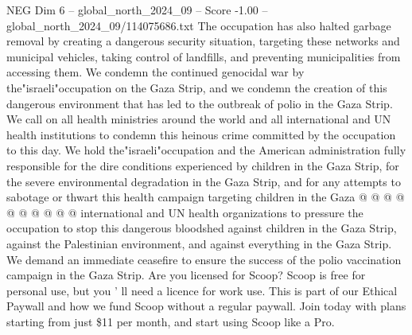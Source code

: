 \begin{textsample}{NEG Dim 6 – global\_north\_2024\_09 – Score -1.00 – global\_north\_2024\_09/114075686.txt}
The occupation has also halted garbage removal by creating a dangerous security situation, targeting these networks and municipal vehicles, taking control of landfills, and preventing municipalities from accessing them.
We condemn the continued genocidal war by the"israeli"occupation on the Gaza Strip, and we condemn the creation of this dangerous environment that has led to the outbreak of polio in the Gaza Strip.
We call on all health ministries around the world and all international and UN health institutions to condemn this heinous crime committed by the occupation to this day.
We hold the"israeli"occupation and the American administration fully responsible for the dire conditions experienced by children in the Gaza Strip, for the severe environmental degradation in the Gaza Strip, and for any attempts to sabotage or thwart this health campaign targeting children in the Gaza @ @ @ @ @ @ @ @ @ @ international and UN health organizations to pressure the occupation to stop this dangerous bloodshed against children in the Gaza Strip, against the Palestinian environment, and against everything in the Gaza Strip.
We demand an immediate ceasefire to ensure the success of the polio vaccination campaign in the Gaza Strip.
Are you licensed for Scoop?
Scoop is free for personal use, but you ' ll need a licence for work use.
This is part of our Ethical Paywall and how we fund Scoop without a regular paywall.
Join today with plans starting from just \$11 per month, and start using Scoop like a Pro.

\end{textsample}
